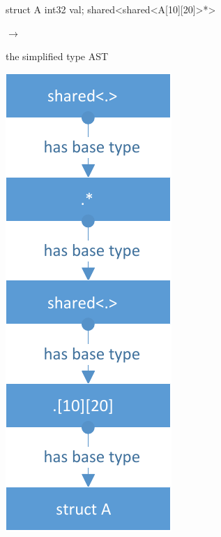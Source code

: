 \begin{minipage}{1\textwidth}
\begin{minipage}{0.3\textwidth}
\begin{ccode}{}
struct A { int32 val; }
shared<shared<A[10][20]>*>
\end{ccode}
\end{minipage}
\begin{minipage}{0.4\textwidth}
\begin{center}
\quad$\longrightarrow$\qquad

the simplified type AST
\end{center}
\end{minipage}
\begin{minipage}{0.2\textwidth}
\includegraphics[scale=0.7]{pics/AstForBaseTypes}
\end{minipage}
\end{minipage}

